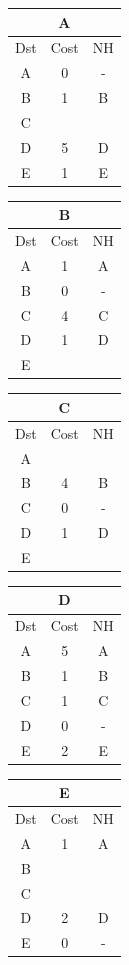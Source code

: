 \documentclass[10pt]{article}
\begin{document}
			\begin{table}[h!]
				\begin{tabular}{|c||c||c|}
					\hline
					\multicolumn{3}{|c|}{A} \\
					\hline
					Dst & Cost & NH \\
					\hline
					A & 0 & - \\
					B & 1 & B \\
					C &   &   \\
					D & 5 & D \\
					E & 1 & E \\
					\hline
				\end{tabular}
				\begin{tabular}{|c||c||c|}
					\hline
					\multicolumn{3}{|c|}{B} \\
					\hline
					Dst & Cost & NH \\
					\hline
					A & 1 & A \\
					B & 0 & - \\
					C & 4 & C \\
					D & 1 & D \\
					E &   &   \\
					\hline
				\end{tabular}
				\begin{tabular}{|c||c||c|}
					\hline
					\multicolumn{3}{|c|}{C} \\
					\hline
					Dst & Cost & NH \\
					\hline
					A &   &   \\
					B & 4 & B \\
					C & 0 & - \\
					D & 1 & D \\
					E &   &   \\
					\hline
				\end{tabular}
				\begin{tabular}{|c||c||c|}
					\hline
					\multicolumn{3}{|c|}{D} \\
					\hline
					Dst & Cost & NH \\
					\hline
					A & 5 & A \\
					B & 1 & B \\
					C & 1 & C \\
					D & 0 & - \\
					E & 2 & E \\
					\hline
				\end{tabular}
				\begin{tabular}{|c||c||c|}
					\hline
					\multicolumn{3}{|c|}{E} \\
					\hline
					Dst & Cost & NH \\
					\hline
					A & 1 & A \\
					B &   &   \\
					C &   &   \\
					D & 2 & D \\
					E & 0 & - \\
					\hline
				\end{tabular}
			\end{table}
\end{document}
